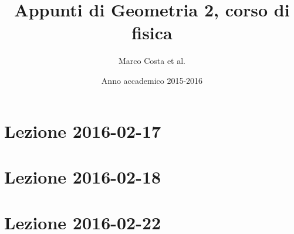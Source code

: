 \documentclass[a4paper]{article}
\title{Appunti di Geometria 2, corso di fisica}
\author{Marco Costa et al.}
\date{Anno accademico 2015-2016}
\theoremstyle{definition}
\theoremstyle{plain}
\theoremstyle{remark}
\newenvironment{lesson}[3]{%
\section{Lezione #1-#2-#3}}{%
}
\newcommand\includelesson[3]{%
\begin{lesson}{#1}{#2}{#3}

\end{lesson}}
\begin{document}
\maketitle

\tableofcontents

\includelesson{2016}{02}{17}
\includelesson{2016}{02}{18}
\includelesson{2016}{02}{22}
\end{document}
